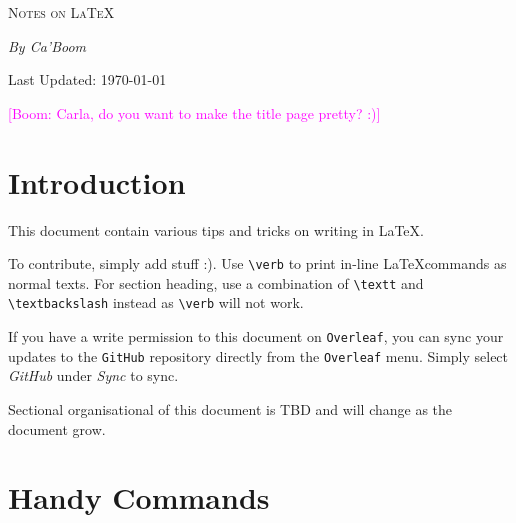 \documentclass[a4paper,12pt]{article}
\newcommand*\boom[1]{\textcolor{magenta}{[Boom: {#1}]}}
\begin{document}
\begin{titlepage}
    \centering
    \vspace*{3cm}  %
    {\scshape \Huge Notes on \LaTeX \par}
    \vspace{6cm}
    {\LARGE \itshape By Ca'Boom \par}
    \vspace{6cm}
    {\Large Last Updated: \today \par}
    \boom{Carla, do you want to make the title page pretty? :)}
    \vfill
\end{titlepage}

\section{Introduction}

This document contain various tips and tricks on writing in \LaTeX.

To contribute, simply add stuff :). Use \verb|\verb| to print in-line \LaTeX commands as normal texts. For section heading, use a combination of \verb|\textt| and \verb|\textbackslash| instead as \verb|\verb| will not work.

If you have a write permission to this document on \texttt{Overleaf}, you can sync your updates to the \texttt{GitHub} repository directly from the \texttt{Overleaf} menu. Simply select \emph{GitHub} under \emph{Sync} to sync.

Sectional organisational of this document is TBD and will change as the document grow.

\section{Handy Commands}
\end{document}
